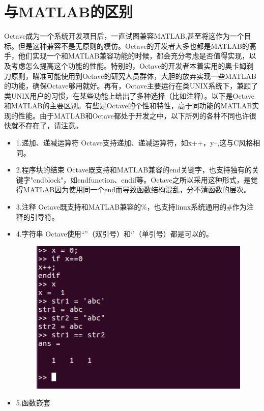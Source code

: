 \documentclass[a4paper,11pt]{ctexart}
\begin{document}
\section{与MATLAB的区别}
 Octave成为一个系统开发项目后，一直试图兼容MATLAB,甚至将这作为一个目标。但是这种兼容不是无原则的模仿。Octave的开发者大多也都是MATLAB的高手，他们实现一个和MATLAB兼容功能的时候，都会充分考虑是否值得实现，以及考虑怎么提高这个功能的性能。特别的，Octave的开发者本着实用的奥卡姆剃刀原则，瞄准可能使用到Octave的研究人员群体，大胆的放弃实现一些MATLAB的功能，确保Octave够用就好。再有，Octave主要运行在类UNIX系统下，兼顾了类UNIX用户的习惯，在某些功能上给出了多种选择（比如注释）。以下是Octave和MATLAB的主要区别。有些是Octave的个性和特性，高于同功能的MATLAB实现的性能。由于MATLAB和Octave都处于开发之中，以下所列的各种不同也许很快就不存在了，请注意。
 \begin{itemize}
	 \item 
1.递加、递减运算符
    Octave支持递加、递减运算符，如x++，y--,这与C风格相同。
	 \item 
2.程序块的结束
    Octave既支持和MATLAB兼容的end关键字，也支持独有的关键字"endblock"，如endfunction、endif等。Octave之所以采用这种形式，是觉得MATLAB因为使用同一个end而导致函数结构混乱，分不清函数的层次。
	 \item 
3.注释
    Octave既支持和MATLAB兼容的\%，也支持linux系统通用的\#作为注释的引导符。
	 \item 
4.字符串
    Octave使用“”（双引号）和‘’（单引号）都是可以的。
	\begin{figure}[H]
		\begin{center}
			\includegraphics[width=.8\textwidth]{dif1.png}
		\end{center}
	\end{figure}
	 \item 
5.函数嵌套

\end{itemize}
\end{document}
